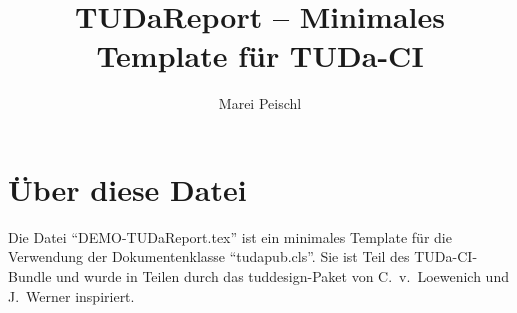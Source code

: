 \documentclass[
	ngerman,%
	accentcolor=9c,%
	type=intern, %
	marginpar=false,%
]{tudapub}
\title{TUDaReport -- Minimales Template für TUDa-CI}
\author{Marei Peischl}
\begin{document}
\maketitle


\tableofcontents


\section{Über diese Datei}

Die Datei \enquote{DEMO-TUDaReport.tex} ist ein minimales Template für die Verwendung der Dokumentenklasse \enquote{tudapub.cls}.
Sie ist Teil des TUDa-CI-Bundle und wurde in Teilen durch das tuddesign-Paket von C.~v.~Loewenich und J.~Werner inspiriert.
\end{document}
